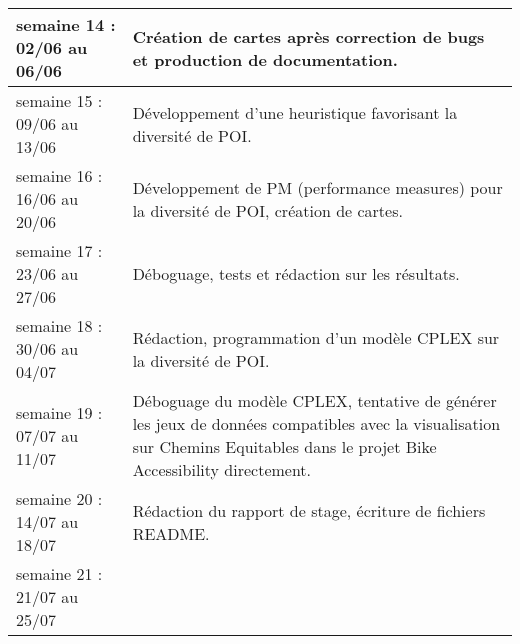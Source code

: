\begin{longtable}[H]{| m{5cm} | m{10cm} |}
\hline
semaine 14 : 02/06 au 06/06 & Création de cartes après correction de bugs et production de documentation.\\
\hline
semaine 15 : 09/06 au 13/06 & Développement d'une heuristique favorisant la diversité de POI. \\
\hline
semaine 16 : 16/06 au 20/06 & Développement de PM (performance measures) pour la diversité de POI, création de cartes. \\
\hline
semaine 17 : 23/06 au 27/06 & Déboguage, tests et rédaction sur les résultats. \\
\hline
semaine 18 : 30/06 au 04/07 & Rédaction, programmation d'un modèle CPLEX sur la diversité de POI. \\
\hline
semaine 19 : 07/07 au 11/07 & Déboguage du modèle CPLEX, tentative de générer les jeux de données compatibles avec la visualisation sur Chemins Equitables dans le projet Bike Accessibility directement. \\
\hline
semaine 20 : 14/07 au 18/07 & Rédaction du rapport de stage, écriture de fichiers README. \\
\hline
semaine 21 : 21/07 au 25/07 & \\
\end{longtable}